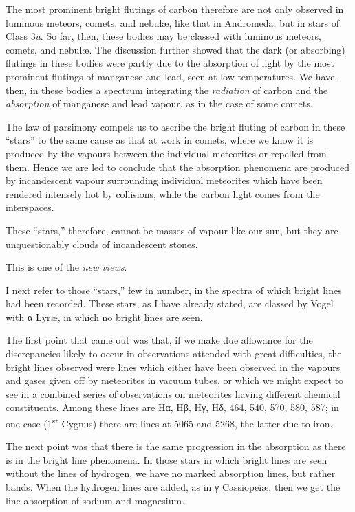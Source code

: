 \documentclass[a4paper, 12pt, oneside, polutonikogreek, english]{article}
\begin{document}
The most prominent bright flutings of carbon therefore are not only observed in luminous meteors, comets, and nebulæ, like that in Andromeda, but in stars of Class 3\emph{a}. So far, then, these bodies may be classed with luminous meteors, comets, and nebulæ. The discussion further showed that the dark (or absorbing) flutings in these bodies were partly due to the absorption of light by the most prominent flutings of manganese and lead, seen at low temperatures. We have, then, in these bodies a spectrum integrating the \emph{radiation} of carbon and the \emph{absorption} of manganese and lead vapour, as in the case of some comets.

The law of parsimony compels us to ascribe the bright fluting of carbon in these ``stars'' to the same cause as that at work in comets, where we know it is produced by the vapours between the individual meteorites or repelled from them. Hence we are led to conclude that the absorption phenomena are produced by incandescent vapour surrounding individual meteorites which have been rendered intensely hot by collisions, while the carbon light comes from the interspaces.

These ``stars,'' therefore, cannot be masses of vapour like our sun, but they are unquestionably clouds of incandescent stones.

This is one of the \emph{new views}.

I next refer to those ``stars,'' few in number, in the spectra of which bright lines had been recorded. These stars, as I have already stated, are classed by Vogel with α Lyræ, in which no bright lines are seen.

The first point that came out was that, if we make due allowance for the discrepancies likely to occur in observations attended with great difficulties, the bright lines observed were lines which either have been observed in the vapours and gases given off by meteorites in vacuum tubes, or which we might expect to see in a combined series of observations on meteorites having different chemical constituents. Among these lines are Hα, Hβ, Hγ, Hδ, 464, 540, 570, 580, 587; in one case (1\textsuperscript{st} Cygnus) there are lines at 5065 and 5268, the latter due to iron.

The next point was that there is the same progression in the absorption as there is in the bright line phenomena. In those stars in which bright lines are seen without the lines of hydrogen, we have no marked absorption lines, but rather bands. When the hydrogen lines are added, as in γ Cassiopeiæ, then we get the line absorption of sodium and magnesium.
\end{document}
